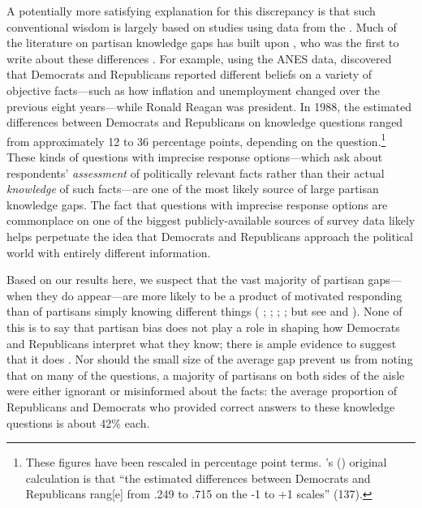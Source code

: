\documentclass[12pt, letterpaper]{article}
\def\citeapos#1{\citeauthor{#1}'s (\citeyear{#1})}
\begin{document}
A potentially more satisfying explanation for this discrepancy is that such conventional wisdom is largely based on studies using data from the \citet{anes_gen}. Much of the literature on partisan knowledge gaps has built upon \citet{bartels_2002}, who was the first to write about these differences \citep{bullocklenz_2019}. For example, using the ANES data, \citet{bartels_2002} discovered that Democrats and Republicans reported different beliefs on a variety of objective facts---such as how inflation and unemployment changed over the previous eight years---while Ronald Reagan was president. In 1988, the estimated differences between Democrats and Republicans on knowledge questions ranged from approximately 12 to 36 percentage points, depending on the question.\footnote{These figures have been rescaled in percentage point terms. \citeapos{bartels_2002}  original calculation is that ``the estimated differences between Democrats and Republicans rang[e] from .249 to .715 on the -1 to +1 scales'' (137).} These kinds of questions with imprecise response options---which ask about respondents' \textit{assessment} of politically relevant facts rather than their actual \textit{knowledge} of such facts---are one of the most likely source of large partisan knowledge gaps. The fact that questions with imprecise response options are commonplace on one of the biggest publicly-available sources of survey data likely helps perpetuate the idea that Democrats and Republicans approach the political world with entirely different information. 

Based on our results here, we suspect that the vast majority of partisan gaps---when they do appear---are more likely to be a product of motivated responding than of partisans simply knowing different things (\citeauthor{bisgaard_slothuus_2018} \citeyear{bisgaard_slothuus_2018}; \citeauthor {bullocketal_2015} \citeyear{bullocketal_2015}; \citeauthor{prior2015you} \citeyear{prior2015you}; \citeauthor{schaffner_luks} \citeyear{schaffner_luks}; but see \citeauthor{berinsky_2017} \citeyear{berinsky_2017} and \citeauthor{peterson_iyengar_forth} \citeyear{peterson_iyengar_forth}). None of this is to say that partisan bias does not play a role in shaping how Democrats and Republicans interpret what they know; there is ample evidence to suggest that it does \citep[e.g.,][]{bisgaard2015bias, gainesetal_2007, khanna2018motivated}. Nor should the small size of the average gap prevent us from noting that on many of the questions, a majority of partisans on both sides of the aisle were either ignorant or misinformed about the facts: the average proportion of Republicans and Democrats who provided correct answers to these knowledge questions is about 42\% each. 
\end{document}
